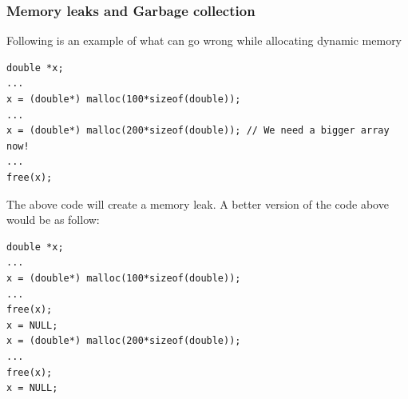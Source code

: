 \documentclass{beamer}
\begin{document}
\begin{frame}[fragile]
\frametitle{Memory leaks and Garbage collection}
Following is an example of what can go wrong while allocating dynamic memory

\begin{block}

\begin{scriptsize}

\begin{verbatim}
double *x;
...
x = (double*) malloc(100*sizeof(double));
...
x = (double*) malloc(200*sizeof(double)); // We need a bigger array now!
...
free(x);
\end{verbatim}

\end{scriptsize}

\end{block}

The above code will create a memory leak. A better 
version of the code above would be as follow:

\begin{block}

\begin{scriptsize}

\begin{verbatim}
double *x;
...
x = (double*) malloc(100*sizeof(double));
...
free(x);
x = NULL;
x = (double*) malloc(200*sizeof(double));
...
free(x);
x = NULL;
\end{verbatim}

\end{scriptsize}

\end{block}

\end{frame}

\end{document}
